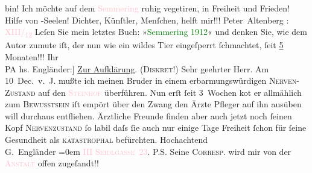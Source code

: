                bin!\pend
           \pstart
           Ich möchte auf dem \textcolor{pink}{Semmering}{}\ledrightnote{\textcolor{pink}{Semmering}} ruhig vegetiren, in
               Freiheit und Frieden! Hilfe von -Seelen!
               Dichter, Künſtler, Menſchen, helft mir!!!\pend
           \pstart \spacefill\mbox{Peter Altenberg}\pend{}\pstart
           \noindent{}{\pb}\label{T_L02120_1v}\label{T_L02120_1h}: \textcolor{pink}{XIII/\textsubscript{12}{ }\label{K_L02120_2v}\label{K_L02120_2h}}{}\ledrightnote{\textcolor{pink}{Otto-Wagner-Spital}}\pend
           \pstart
           Leſen Sie mein letztes Buch:\pend
           \pstart
           \centering{}»\textcolor{green}{Semmering 1912}{}\ledrightnote{\textcolor{green}{»Semmering 1912«}}«\pend
           \pstart
           \noindent{}und denken Sie, wie dem Autor zumute iſt, der nun wie ein wildes Tier eingeſperrt
                  ſchmachtet, ſeit \uline{5} Monaten!!!\pend
           \pstart
           Ihr{\\}\spacefill\mbox{PA}\pend
           \pstart
           \noindent{}{\pb}{[}hs. Engländer:{]} \uline{Zur Aufklärung}. \textsc{(Diskret!)}\pend
           \pstart{}Sehr geehrter Herr.\pend\pstart
           Am 10 Dec. v. J. mußte ich meinen Bruder in einem erbarmungswürdigen \textsc{Nerven-Zustand} auf den \textcolor{pink}{\textsc{Steinhof}}{}\ledrightnote{\textcolor{pink}{Otto-Wagner-Spital}} überführen.\pend
           \pstart
           Nun erſt ſeit 3 {\pb}Wochen ko{\geminationm}t er allmählich zum \textsc{Bewusstsein}{ }{\kaufmannsund} iſt empört über den Zwang den Ärzte{ }{\kaufmannsund} Pfleger auf ihn ausüben {\kaufmannsund}
               will durchaus entfliehen. Ärztliche {\pb}Freunde finden aber auch jetzt noch ſeinen Kopf {\kaufmannsund}{ }\textsc{Nervenzustand} ſo labil daſs ſie auch nur einige Tage
               Freiheit ſchon für ſeine Gesundheit als \textsc{katastrophal}
               befürchten.\pend
           \pstart
           Hochachtend{\\[\baselineskip]}\spacefill\mbox{G. Engländer}\pend
           \leftskip=0em{}\pstart
           \noindent{}\textcolor{pink}{III \textsc{Seidlgasse} 23}{}\ledrightnote{\textcolor{pink}{Seidlgasse}}.\pend
           \pstart
           P.S. Seine \textsc{Correſp}. wird mir von der \textcolor{pink}{\textsc{Anstalt}}{}\ledrightnote{\textcolor{pink}{Otto-Wagner-Spital}} offen zugeſandt!!\pend
           \endnumbering{}  
      